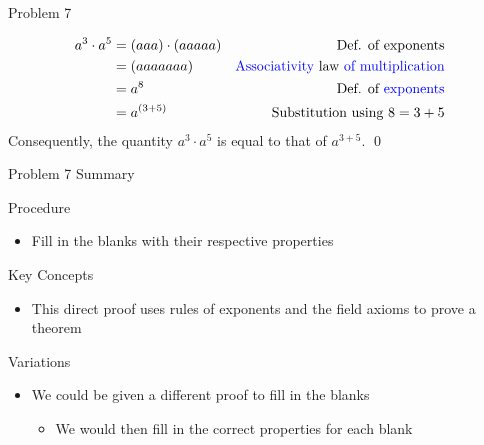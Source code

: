 \begin{problem}{Problem 7}
\begin{Highlight}[Solution]
        \begin{align*}
            a^{3} \cdot a^{5} & = (aaa) \cdot (aaaaa) & \text{Def. of exponents} \\
            & = (aaaaaaa) & \text{\textcolor{blue}{Associativity} law \textcolor{blue}{of multiplication}} \\
            & = a^{8} & \text{Def. of \textcolor{blue}{exponents}} \\
            & = a^{(3 + 5)} & \text{Substitution using } 8 = 3 + 5
        \end{align*}
        Consequently, the quantity $a^{3}\cdot a^{5}$ is equal to that of $a^{3 + 5}$. \qed
    \end{Highlight}
\end{problem}

\begin{summary}{Problem 7 Summary}
    \begin{statement}{Procedure}
        \begin{itemize}
            \item Fill in the blanks with their respective properties
        \end{itemize}
    \end{statement}
    \begin{statement}{Key Concepts}
        \begin{itemize}
            \item This direct proof uses rules of exponents and the field axioms to prove a theorem
        \end{itemize}
    \end{statement}
    \begin{statement}{Variations}
        \begin{itemize}
            \item We could be given a different proof to fill in the blanks
            \begin{itemize}
                \item We would then fill in the correct properties for each blank
            \end{itemize}
        \end{itemize}
    \end{statement}
\end{summary}

